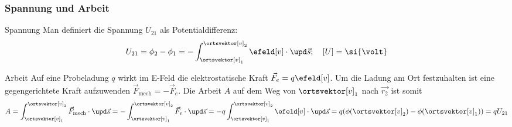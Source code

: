 \begin{frame}
  \frametitle{Spannung und Arbeit}
  \begin{block}{Spannung}
    Man definiert die
    \alert{Spannung} $U_{21}$ als \alert{Potentialdifferenz}:
    $$
    U_{21} = \phi_2 - \phi_1 = - \int_{\ortsvektor[v]_1}^{\ortsvektor[v]_2}
    \efeld[v]\cdot \upd \vec{s}; \quad [U] = \si{\volt}
    $$
    \end{block}
    \begin{block}{Arbeit}
      Auf eine Probeladung $q$ wirkt im E-Feld die elektrostatische
      Kraft $\vec{F}_e = q\efeld[v]$. Um die Ladung am Ort
      festzuhalten ist eine gegengerichtete Kraft aufzuwenden
      $\vec{F}_\text{mech} = -\vec{F}_e$. Die \alert{Arbeit} $A$
      auf dem Weg von $\ortsvektor[v]_1$ nach $\vec{r_2}$ ist somit
      $$
      A = \int_{\ortsvektor[v]_1}^{\ortsvektor[v]_2}
      \vec{F}_\text{mech}\cdot\upd\vec{s} = - \int_{\ortsvektor[v]_1}^{\ortsvektor[v]_2}
      \vec{F}_e\cdot\upd\vec{s} = -q\int_{\ortsvektor[v]_1}^{\ortsvektor[v]_2}
      \efeld[v]\cdot\upd\vec{s} = q (\phi(\ortsvektor[v]_2)-\phi({\ortsvektor[v]_1)})
      = q U_{21}  
      $$
     
    \end{block}
\end{frame}


